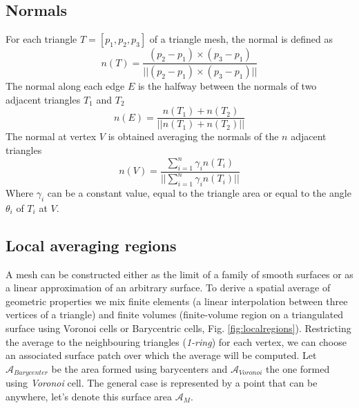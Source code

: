 \subsection{Normals}
For each triangle $T=[p_1, p_2, p_3]$ of a triangle mesh, the normal is defined as
$$n(T) = \frac{(p_2 - p_1) \times (p_3 - p_1)}{||(p_2 - p_1) \times (p_3 - p_1)||}$$
The normal along each edge $E$ is the halfway between the normals of two adjacent triangles $T_1$ and $T_2$
$$n(E) = \frac{n(T_1) + n(T_2)}{||n(T_1) + n(T_2)||}$$
The normal at vertex $V$ is obtained averaging the normals of the $n$ adjacent triangles
$$n(V) = \frac{\sum_{i =1}^n \gamma_i n(T_i)}{||\sum_{i =1}^n \gamma_i n(T_i)||}$$
Where $\gamma_i$ can be a constant value, equal to the triangle area or equal to the angle $\theta_i$ of $T_i$ at $V$.
\cite{geometryprocessing}

\subsection{Local averaging regions} \label{section:localaveraging}
A mesh can be constructed either as the limit of a family of smooth surfaces or as a linear approximation of an arbitrary surface. To derive a spatial average of geometric properties we mix finite elements (a linear interpolation between three vertices of a triangle) and finite volumes (finite-volume region on a triangulated surface using Voronoi cells or Barycentric cells, Fig. \ref{fig:localregions}). Restricting the average to the neighbouring triangles (\textit{1-ring}) for each vertex, we can choose an associated surface patch over which the average will be computed.
Let $\mathcal{A}_{Barycenter}$ be the area formed using barycenters and $\mathcal{A}_{Voronoi}$ the one formed using \textit{Voronoi} cell. The general case is represented by a point that can be anywhere, let's denote this surface area $\mathcal{A}_M$.

